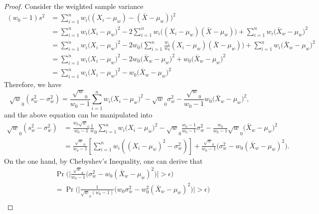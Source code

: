 \documentclass[12pt]{article}
\begin{document}
\begin{proof} 
Consider the weighted sample variance
\begin{equation*}
    \begin{split}
        (w_0 - 1)s^2 & = \sum_{i=1}^n w_i \Big((X_i-\mu_w) - (\bar X-\mu_w)\Big)^2 \\
        & =\sum_{i=1}^n w_i \Big(X_i -\mu_w \Big)^2 - 2\sum_{i=1}^n w_i \Big((X_i-\mu_w)(\bar X -\mu_w)\Big)+\sum_{i=1}^n w_i \Big(\bar X_w -\mu_w \Big)^2 \\
        & =\sum_{i=1}^n w_i \Big(X_i -\mu_w \Big)^2 - 2 w_0 \Big(\sum_{i=1}^n \frac{w_i}{w_0}(X_i-\mu_w)(\bar X -\mu_w)\Big)+\sum_{i=1}^n w_i \Big(\bar X_w -\mu_w \Big)^2 \\
        & =\sum_{i=1}^n w_i \Big(X_i-\mu_w \Big)^2 - 2 w_0\Big(\bar X_w - \mu_w \Big)^2 + w_0\Big(\bar X_w - \mu_w \Big)^2 \\
        & = \sum_{i=1}^n w_i \Big(X_i-\mu_w \Big)^2 - w_0\Big(\bar X_w - \mu_w \Big)^2
    \end{split}
\end{equation*}
Therefore, we have 
\begin{equation*}
    \sqrt w_0 (s_w^2 - \sigma_w^2) = \frac {\sqrt w_0}{w_0 - 1}\sum_{i=1}^n w_i \Big(X_i-\mu_w\Big)^2 -\sqrt w_0 \sigma_w^2-  \frac {\sqrt w_0}{w_0-1} w_0 \Big(\bar X_w -\mu_w\Big)^2,
\end{equation*}
and the above equation can be manipulated into
\begin{equation}
    \label{eqn:manipulated_eqn}
    \begin{split}
        \sqrt w_0 (s_w^2 - \sigma_w^2) & = \frac{w_0 \sqrt w_0}{w_0 -1}\frac 1 w_0\sum_{i=1}^n w_i \Big(X_i - \mu_w \Big)^2 -\sqrt w_0 \frac {w_0 - 1}{w_0 - 1}\sigma_w^2-  \frac {w_0}{w_0-1}\sqrt w_0 \Big(\bar X_w -\mu_w\Big)^2 \\
        & =\frac {\sqrt w_0}{w_0 - 1}\left[\sum_{i=1}^n w_i \left((X_i-\mu_w)^2 - \sigma_w^2\right)\right] + \frac {\sqrt w_0}{w_0 - 1}\Big(\sigma_w^2 -  w_0 (\bar X_w -\mu_w)^2 \Big).
    \end{split}
\end{equation}
On the one hand, by Chebyshev's Inequality, one can derive that
\begin{equation*}
    \begin{split}
        & \Pr\Bigg(\Bigg|\frac {\sqrt w_0}{w_0-1}\Big(\sigma_w^2 -  w_0 (\bar X_w -\mu_w)^2 \Big)\Bigg| > \epsilon \Bigg)  \\
        & = \Pr\Bigg(\Bigg|\frac {1}{\sqrt w_0(w_0-1)}\Big(w_0 \sigma_w^2 -  w_0^2 (\bar X_w -\mu_w)^2 \Big)\Bigg| > \epsilon \Bigg) \\

\end{split}
\end{equation*}
\end{proof}
\end{document}
